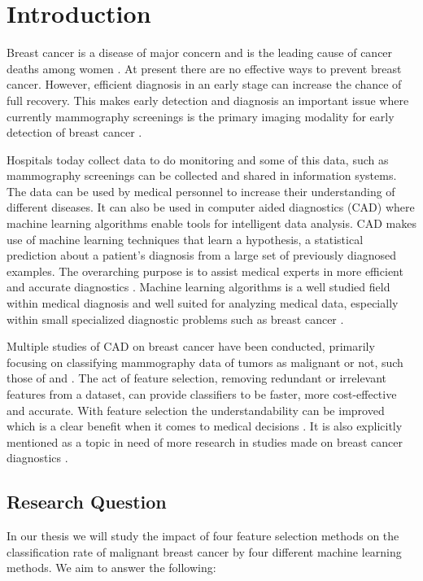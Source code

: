 \chapter{Introduction}

Breast cancer is a disease of major concern and is the leading cause of cancer deaths among women \parencite{althuis2005}. At present there are no effective ways to prevent breast cancer. However, efficient diagnosis in an early stage can increase the chance of full recovery. This makes early detection and diagnosis an important issue where currently mammography screenings is the primary imaging modality for early detection of breast cancer \parencite{tabar2001}.

Hospitals today collect data to do monitoring and some of this data, such as mammography screenings can be collected and shared in information systems. The data can be used by medical personnel to increase their understanding of different diseases. It can also be used in computer aided diagnostics (CAD) where machine learning algorithms enable tools for intelligent data analysis. CAD makes use of machine learning techniques that learn a hypothesis, a statistical prediction about a patient's diagnosis from a large set of previously diagnosed examples.  The overarching purpose is to assist medical experts in more efficient and accurate diagnostics \parencite{li2007}. Machine learning algorithms is a well studied field within medical diagnosis and well suited for analyzing medical data, especially within small specialized diagnostic problems such as breast cancer \parencite{kononenko2001}.

Multiple studies of CAD on breast cancer have been conducted, primarily focusing on classifying mammography data of tumors as malignant or not, such those of \textcite{ramos2012} and \textcite{akay2009}. The act of feature selection, removing redundant or irrelevant features from a dataset, can provide classifiers to be faster, more cost-effective and accurate. With feature selection the understandability can be improved which is a clear benefit when it comes to medical decisions \parencite{karabulut2012}. It is also explicitly mentioned as a topic in need of more research in studies made on breast cancer diagnostics \parencite{akin2011}.


\section{Research Question}

In our thesis we will study the impact of four feature selection methods on the classification rate of malignant breast cancer by four different machine learning methods. We aim to answer the following:


